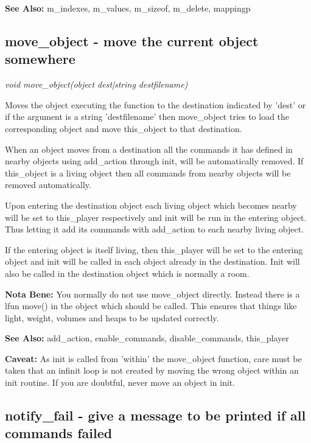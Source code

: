     {\bf See Also: }    m\_indexes, m\_values, m\_sizeof, m\_delete, mappingp



\subsection{move\_object - move the current object somewhere}

    {\em void move\_object(object dest|string destfilename)}

    Moves the object executing the function to the destination indicated
    by 'dest' or if the argument is a string 'destfilename' then 
    move\_object tries to load the corresponding object and move 
    this\_object to that destination.

    When an object moves from a destination all the commands it has
    defined in nearby objects using add\_action through init, will be
    automatically removed. If this\_object is a living object then
    all commands from nearby objects will be removed automatically.

    Upon entering the destination object each living object which becomes
    nearby will be set to this\_player respectively and init will be run
    in the entering object. Thus letting it add its commands with 
    add\_action to each nearby living object.

    If the entering object is itself living, then this\_player will be
    set to the entering object and init will be called in each object
    already in the destination. Init will also be called in the
    destination object which is normally a room.

    {\bf Nota Bene: }   You normally do not use move\_object directly. Instead there is
    a lfun move() in the object which should be called. This ensures
    that things like light, weight, volumes and heaps to be updated
    correctly.

    {\bf See Also: }    add\_action, enable\_commands, disable\_commands, this\_player

    {\bf Caveat: }  As init is called from 'within' the move\_object function, care must
    be taken that an infinit loop is not created by moving the wrong
    object within an init routine. If you are doubtful, never move
    an object in init.



\subsection{notify\_fail - give a message to be printed if all commands failed}

